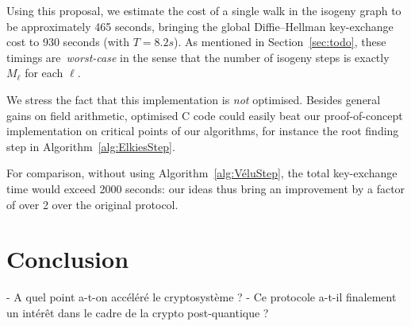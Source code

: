 \documentclass{llncs}
\begin{document}
Using this proposal, we estimate the cost of a single walk in the
isogeny graph to be approximately 465 seconds, bringing the global
Diffie--Hellman key-exchange cost to 930 seconds (with $T = 8.2s$).
As mentioned in Section~\ref{sec:todo}, these timings are~\emph{worst-case}
in the sense that the number of isogeny steps is exactly $M_\ell$ for each $\ell$.

We stress the fact that this implementation
is \emph{not} optimised. Besides general gains on field arithmetic,
optimised C code could easily beat our proof-of-concept implementation
on critical points of our algorithms, for instance the root
finding step in Algorithm~\ref{alg:ElkiesStep}.

For comparison, without using Algorithm~\ref{alg:VéluStep}, the
total key-exchange time would exceed 2000 seconds:
our ideas thus bring an improvement by a factor of over 2 over the
original protocol.

\section{Conclusion}

- A quel point a-t-on accéléré le cryptosystème ?
- Ce protocole a-t-il finalement un intérêt dans le cadre de la crypto post-quantique ?




\end{document}
